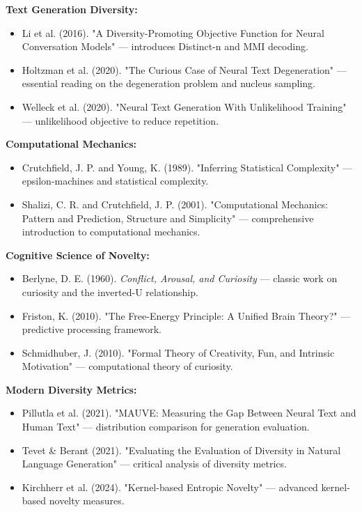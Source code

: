 \textbf{Text Generation Diversity:}
\begin{itemize}
\item Li et al. (2016). "A Diversity-Promoting Objective Function for Neural Conversation Models" --- introduces Distinct-n and MMI decoding.
\item Holtzman et al. (2020). "The Curious Case of Neural Text Degeneration" --- essential reading on the degeneration problem and nucleus sampling.
\item Welleck et al. (2020). "Neural Text Generation With Unlikelihood Training" --- unlikelihood objective to reduce repetition.
\end{itemize}

\textbf{Computational Mechanics:}
\begin{itemize}
\item Crutchfield, J. P. and Young, K. (1989). "Inferring Statistical Complexity" --- epsilon-machines and statistical complexity.
\item Shalizi, C. R. and Crutchfield, J. P. (2001). "Computational Mechanics: Pattern and Prediction, Structure and Simplicity" --- comprehensive introduction to computational mechanics.
\end{itemize}

\textbf{Cognitive Science of Novelty:}
\begin{itemize}
\item Berlyne, D. E. (1960). \textit{Conflict, Arousal, and Curiosity} --- classic work on curiosity and the inverted-U relationship.
\item Friston, K. (2010). "The Free-Energy Principle: A Unified Brain Theory?" --- predictive processing framework.
\item Schmidhuber, J. (2010). "Formal Theory of Creativity, Fun, and Intrinsic Motivation" --- computational theory of curiosity.
\end{itemize}

\textbf{Modern Diversity Metrics:}
\begin{itemize}
\item Pillutla et al. (2021). "MAUVE: Measuring the Gap Between Neural Text and Human Text" --- distribution comparison for generation evaluation.
\item Tevet \& Berant (2021). "Evaluating the Evaluation of Diversity in Natural Language Generation" --- critical analysis of diversity metrics.
\item Kirchherr et al. (2024). "Kernel-based Entropic Novelty" --- advanced kernel-based novelty measures.
\end{itemize}

